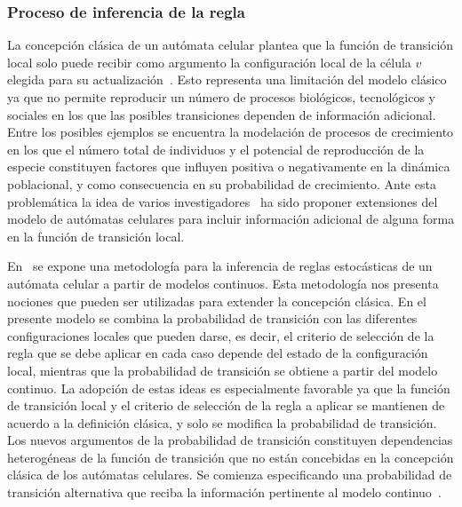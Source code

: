 \subsubsection{Proceso de inferencia de la regla}
La concepci\'on cl\'asica de un aut\'omata celular plantea que la funci\'on de transici\'on local solo puede recibir como argumento la configuraci\'on local de la c\'elula $v$ elegida para su actualizaci\'on~\cite{book}. Esto representa una limitaci\'on del modelo cl\'asico ya que no permite reproducir un n\'umero de procesos biol\'ogicos, tecnol\'ogicos y sociales en los que las posibles transiciones dependen de informaci\'on adicional. Entre los posibles ejemplos se encuentra la modelaci\'on de procesos de crecimiento en los que el n\'umero total de individuos y el potencial de reproducci\'on de la especie constituyen factores que influyen positiva o negativamente en la din\'amica poblacional, y como consecuencia en su probabilidad de crecimiento. Ante esta problem\'atica la idea de varios investigadores~\cite{guinot,ruben,ruanxiaoca,ruanxiaodiff} ha sido proponer extensiones del modelo de aut\'omatas celulares para incluir informaci\'on adicional de alguna forma en la funci\'on de transici\'on local. 

En~\cite{guinot} se expone una metodolog\'ia para la inferencia de reglas estoc\'asticas de un aut\'omata celular a partir de modelos continuos. Esta metodolog\'ia nos presenta nociones que pueden ser utilizadas para extender la concepci\'on cl\'asica. En el presente modelo se combina la probabilidad de transici\'on con las diferentes configuraciones locales que pueden darse, es decir, el criterio de selecci\'on de la regla que se debe aplicar en cada caso depende del estado de la configuraci\'on local, mientras que la probabilidad de transici\'on se obtiene a partir del modelo continuo. La adopci\'on de estas ideas es especialmente favorable ya que la funci\'on de transici\'on local y el criterio de selecci\'on de la regla a aplicar se mantienen de acuerdo a la definici\'on cl\'asica, y solo se modifica la probabilidad de transici\'on. Los nuevos argumentos de la probabilidad de transici\'on constituyen dependencias heterog\'eneas de la funci\'on de transici\'on que no est\'an concebidas en la concepci\'on cl\'asica de los aut\'omatas celulares. Se comienza especificando una probabilidad de transici\'on alternativa que reciba la informaci\'on pertinente al modelo continuo~\cite{guinot}.

